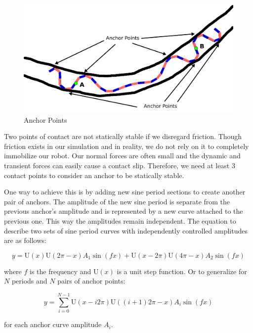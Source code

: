 \begin{figure}
\begin{center}
\includegraphics[scale=0.4]{ref_points_pose2.png}
\end{center}
\caption{Anchor Points}
\label{fig:anchor_points}
\end{figure}


Two points of contact are not statically stable if we disregard friction.  Though friction exists in our simulation and in reality, we do not rely on it to completely immobilize our robot.  Our normal forces are often small and the dynamic and transient forces can easily cause a contact slip.  Therefore, we need at least 3 contact points to consider an anchor to be statically stable.

One way to achieve this is by adding new sine period sections to create another pair of anchors.  The amplitude of the new sine period is separate from the previous anchor’s amplitude and is represented by a new curve attached to the previous one. This way the amplitudes remain independent.  The equation to describe two sets of sine period curves with independently controlled amplitudes are as follows:

\begin{equation}
y = \mathrm{U}(x)  \mathrm{U}(2\pi-x) A_1 \sin(fx) + \mathrm{U}(x-2\pi) \mathrm{U}(4\pi-x) A_2 \sin(fx)
\end{equation}

where $f$ is the frequency and $\mathrm{U}(x)$ is a unit step function.  Or to generalize for $N$ periods and $N$ pairs of anchor points:

\begin{equation}
y = \sum_{i=0}^{N-1} \mathrm{U}(x-i 2\pi) \mathrm{U}((i+1) 2\pi-x) A_i \sin(fx)
\end{equation}


for each anchor curve amplitude $A_i$.

